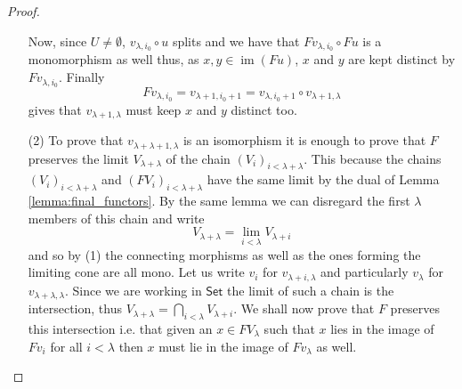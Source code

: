 \documentclass[letterpaper, 11pt, oneside]{memoir}
\theoremstyle{myteo}
\numberwithin{equation}{section}
\newcommand{\Set}{\textsf{Set}}
\DeclareMathOperator{\im}{im}
\begin{document}
\begin{proof}
\begin{itemize}
    Now, since \(U \neq \emptyset\), \(v_{\lambda, i_0} \circ u\) splits and we have that \(Fv_{\lambda, i_0} \circ Fu\) is a monomorphism as well thus, as \(x, y \in \im (Fu)\), \(x\) and \(y\) are kept distinct by \(Fv_{\lambda, i_0}\).
    Finally
    \begin{equation*}
      Fv_{\lambda, i_0} = v_{\lambda + 1, i_0 + 1} = v_{\lambda, i_0 + 1} \circ v_{\lambda + 1, \lambda}
    \end{equation*}
    gives that \(v_{\lambda + 1, \lambda}\) must keep \(x\) and \(y\) distinct too.
  \item[(2)]
    To prove that \(v_{\lambda + \lambda + 1, \lambda}\) is an isomorphism it is enough to prove that \(F\) preserves the limit \(V_{\lambda + \lambda}\) of the chain \((V_i)_{i < \lambda + \lambda}\).
    This because the chains \((V_i)_{i < \lambda + \lambda}\) and \((FV_i)_{i < \lambda + \lambda}\) have the same limit by the dual of Lemma \ref{lemma:final_functors}.
    By the same lemma we can disregard the first \(\lambda\) members of this chain and write
    \begin{equation*}
      V_{\lambda + \lambda} = \lim_{i < \lambda} V_{\lambda + i}
    \end{equation*}
    and so by (1) the connecting morphisms as well as the ones forming the limiting cone are all mono.
    Let us write \(v_i\) for \(v_{\lambda + i, \lambda}\) and particularly \(v_\lambda\) for \(v_{\lambda + \lambda, \lambda}\).
    Since we are working in \(\Set\) the limit of such a chain is the intersection, thus \(V_{\lambda + \lambda} = \bigcap_{i < \lambda} V_{\lambda + i}\).
    We shall now prove that \(F\) preserves this intersection i.e. that given an \(x \in FV_\lambda\) such that \(x\) lies in the image of \(Fv_i\) for all \(i < \lambda\) then \(x\) must lie in the image of \(Fv_\lambda\) as well.


\end{itemize}
\end{proof}
\end{document}
